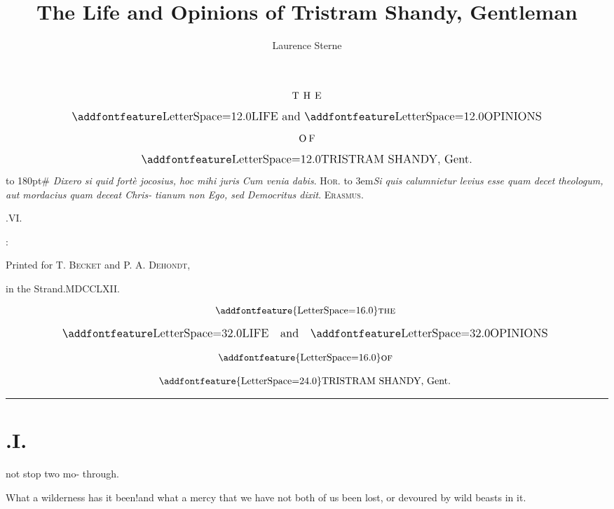 \documentclass[twoside]{article}
\title{The Life and Opinions of Tristram Shandy, Gentleman}
\author{Laurence Sterne}
\begin{document}
\pagestyle{empty}
\null
\vfill
$$\vbox{\openup 10pt\halign{\hss #\hss\cr
\hbox to 3em{T H E}\cr
\large \ls{LIFE} and \ls{OPINIONS}\cr
\hbox to 1.6em{O F}\cr
\large \ls{TRISTRAM SHANDY}, Gent.\cr
}}$$
\vfill
\newpage
\null
\newpage %
\vbox{\openup 10pt}
\vfill
\vbox{\openup -2pt\halign to 180pt{\footnotesize #\cr
\textit{Dixero si quid fortè jocosius, hoc mihi juris}\hfill\cr
\textit{Cum venia dabis}. \hfill \textsc{Hor.}\cr
\noalign{\vskip 4pt}
\hbox to 3em{\tsh}\textit{Si quis calumnietur levius esse quam decet}\cr
\quad\textit{theologum, aut mordacius quam deceat Chris-}\cr
\quad\textit{tianum \tsh non Ego, sed Democritus dixit}.\tsh\cr
\hfill\textsc{Erasmus}.\cr}}
\vfill
\centerline{.\quad VI.}
\vfill
\centerline{:}
\centerline{\small Printed for T. \textsc{Becket} and P. A. \textsc{Dehondt},}
\centerline{\small in the Strand.\quad MDCCLXII.}

\newpage
\null
\newpage
\pagestyle{fancy}
\thispagestyle{empty}
\setcounter{page}{1}
\hbox{}\vskip -36pt

\[\vbox{\openup 12pt\halign{\hss # \hss\cr
\addfontfeature{LetterSpace=16.0}\textsc{the}\cr
\large\lsss{LIFE}\quad and\quad \lsss{OPINIONS}\cr
\addfontfeature{LetterSpace=16.0}\textsc{of}\cr
{\addfontfeature{LetterSpace=24.0}TRISTRAM SHANDY}, Gent.\cr}}\]

\vskip 12pt
\hrule

\bigskip
\setlength{\baselineskip}{14pt}  %
\sloppy

\section{.\enspace I.}

 not stop two mo-\break
{}\break
{}
through.\tsh

\tsh What a wilderness has it been!\break and what a
mercy that we have not both of us been
lost, or devoured by wild beasts in it.
\end{document}
